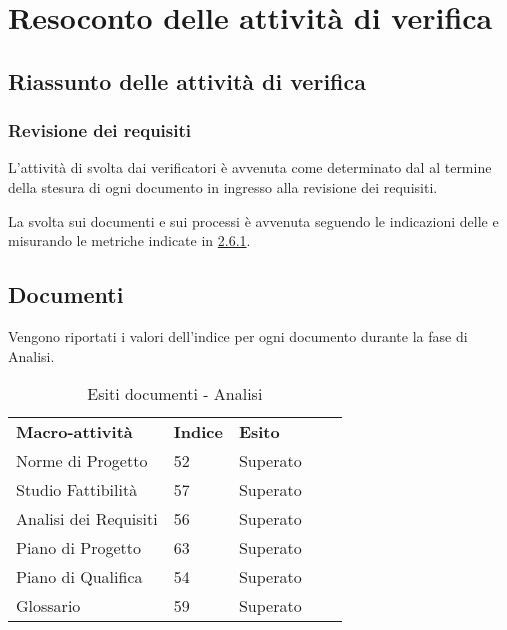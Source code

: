 \newpage
\section{Resoconto delle attività di verifica} \label{App:AppendixA}
	\subsection{Riassunto delle attività di verifica} \label{App:AppendixA}
		\subsubsection{Revisione dei requisiti} \label{App:AppendixA}
			
			L'attività di  svolta dai verificatori è avvenuta come determinato dal \PianoDiProgetto al termine della stesura di ogni documento in ingresso alla revisione dei requisiti.
			
			La  svolta sui documenti e sui processi è avvenuta seguendo le indicazioni delle \NormeDiProgetto e misurando le metriche indicate in \hyperlink{metriche_documenti}{2.6.1}.
\subsection{Documenti} \label{App:AppendixB}
	
		Vengono riportati i valori dell’indice  per ogni documento durante la fase di Analisi. 
		
		\begin{table}[!ht]
			\centering
				\begin{tabular}{|l|l|l|ll}
					\cline{1-3}
					 \textbf{Macro-attività}  & \textbf{Indice \glossaryItem{Gulpease}}  & \textbf{Esito}  &  \\ \cline{1-3}
					 Norme di Progetto  & 52 & Superato &  \\ \cline{1-3}
					 Studio Fattibilità & 57 & Superato &  \\ \cline{1-3}
					 Analisi dei Requisiti & 56 & Superato &  \\ \cline{1-3}
					 Piano di Progetto & 63 & Superato &  \\ \cline{1-3}
					 Piano di Qualifica & 54 & Superato &  \\ \cline{1-3}
					 Glossario & 59 & Superato &  \\ \cline{1-3}
				\end{tabular}
				\caption{Esiti  documenti - Analisi}
		\end{table}
